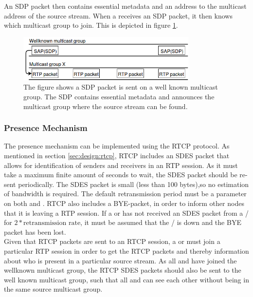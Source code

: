An SDP packet then contains essential metadata and an address to the multicast address of the source stream. When a \subs{} receives an SDP packet, it then knows which multicast group to join. This is depicted in figure \ref{fig:design:sessionannouncement}.

\begin{figure}[H]
	\centering
	\includegraphics[width=0.8\textwidth]{figures/sap-figure}
	 \caption{The figure shows a SDP packet is sent on a well known multicast group. The SDP contains essential metadata and announces the multicast group where the source stream can be found.}\label{fig:design:sessionannouncement}
\end{figure}


\subsubsection{Presence Mechanism} \label{sec:design:presencemechanism}
The presence mechanism can be implemented using the RTCP protocol. As mentioned in section \ref{sec:design:rtcp}, RTCP includes an SDES packet that allows for identification of senders and receivers in an RTP session.
As it must take a maximum finite amount of seconds to wait, the SDES  packet should be re-sent periodically. The SDES packet is small (less than 100 bytes),so no estimation of bandwidth is required. The default retransmission period must be a parameter on both \sub{} and \pub{}.
RTCP also includes a BYE-packet, in order to inform other nodes that it is leaving a RTP session.
If a  or  has not received an SDES packet from a / for $2*\text{retransmission rate}$, it must be assumed that the / is down and the BYE packet has been lost.\\

Given that RTCP packets are sent to an RTCP session, a \sub{} or \pub{} must join a particular RTP session in order to get the RTCP packets and thereby information about who is present in a particular source stream. As all \pubs{} and \subs{} have joined the wellknown multicast group, the RTCP SDES packets should also be sent to the well known multicast group, such that all \pubs{} and \subs{} can see each other without being in the same source multicast group.

